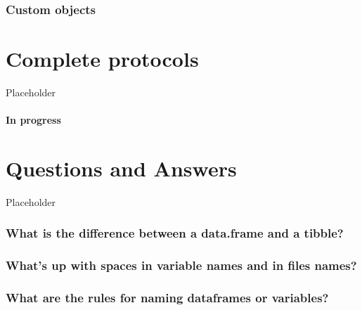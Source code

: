 \documentclass[
]{book}
\begin{document}
\hypertarget{custom-objects}{%
\subsection{Custom objects}\label{custom-objects}}

\hypertarget{complete-protocols}{%
\chapter{Complete protocols}\label{complete-protocols}}

Placeholder

\hypertarget{in-progress}{%
\subsubsection*{In progress}\label{in-progress}}

\hypertarget{questions-and-answers}{%
\chapter{Questions and Answers}\label{questions-and-answers}}

Placeholder

\hypertarget{what-is-the-difference-between-a-data.frame-and-a-tibble}{%
\subsection*{What is the difference between a data.frame and a tibble?}\label{what-is-the-difference-between-a-data.frame-and-a-tibble}}

\hypertarget{whats-up-with-spaces-in-variable-names-and-in-files-names}{%
\subsection*{What's up with spaces in variable names and in files names?}\label{whats-up-with-spaces-in-variable-names-and-in-files-names}}

\hypertarget{what-are-the-rules-for-naming-dataframes-or-variables}{%
\subsection*{What are the rules for naming dataframes or variables?}\label{what-are-the-rules-for-naming-dataframes-or-variables}}
\end{document}
